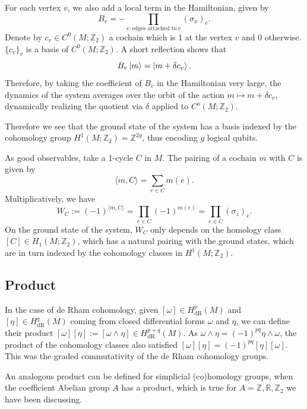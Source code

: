\documentclass[12pt]{article}
\numberwithin{equation}{section}
\theoremstyle{remark}
\def\bR{\mathbb{R}}
\def\bZ{\mathbb{Z}}
\begin{document}
For each vertex $v$, we also add a local term in the Hamiltonian,
given by 
\begin{equation}
  B_v=-\prod_{e: \text{edges attached to}\ v} (\sigma_x)_e.
\end{equation}
Denote by $c_v\in C^0(M;\bZ_2)$ 
a cochain which is 1 at the vertex $v$ and 0 otherwise.
$\{c_v\}_v$ is a basis of $C^0(M;\bZ_2)$.
A short reflection shows that \begin{equation}
B_v \ket{m} = \ket{m+\delta c_v}.
\end{equation}
Therefore, by taking the coefficient of $B_v$ in the Hamiltonian very large,
the dynamics of the system averages over the orbit of the action $m\mapsto m+\delta c_v$,
dynamically realizing the quotient via $\delta$ applied to $C^o(M;\bZ_2)$.

Therefore we see that the ground state of the system has a basis indexed by the cohomology group $H^1(M;\bZ_2)=\bZ^{2g}$,
thus encoding $g$ logical qubits.

As good observables, take a 1-cycle $C$ in $M$.
The pairing of a cochain $m$ with $C$ is given by \begin{equation}
\langle m,C\rangle = \sum_{e\in C} m(e).
\end{equation} Multiplicatively, we have \begin{equation}
W_C:= (-1)^{\langle m,C\rangle} = \prod_{e\in C} (-1)^{m(e)} = \prod_{e \in C} (\sigma_z)_e.
\end{equation}
On the ground state of the system, $W_C$ only depends on the homology class $[C]\in H_1(M;\bZ_2)$,
which has a natural pairing with the ground states,
which are in turn indexed by the cohomology classes in  $H^1(M;\bZ_2)$.

\subsection{Product}

In the case of de Rham cohomology, 
given $[\omega]\in H^p_\text{dR}(M)$ and $[\eta]\in H^q_\text{dR}(M)$ coming from
closed differential forms $\omega$ and $\eta$,
we can define their product $[\omega][\eta] := [\omega \wedge \eta]\in H^{p+q}_\text{dR}(M)$.
As $\omega\wedge \eta=(-1)^{pq}\eta\wedge\omega$,
the product of the cohomology classes also satisfied 
$[\omega] [\eta]=(-1)^{pq}[\eta] [\omega]$.
This was the graded commutativity of the de Rham cohomology groups.

An analogous product can be defined for simplicial (co)homology groups, when the coefficient Abelian group $A$ has a product,
 which is true for $A=\bZ,\bR,\bZ_2$ we have been discussing.
\end{document}
